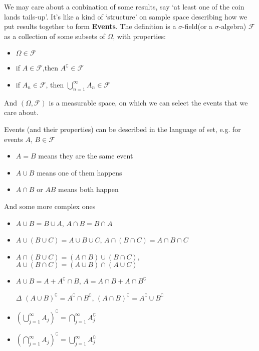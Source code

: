     We may care about a conbination of some results, say `at least one of the coin lands tails-up'. It's like a kind of `structure' on sample space describing how we put results together to form \textbf{Events}. The definition is  a $\sigma$-field(or a $\sigma$-algebra) $\mathscr{F}$ as a collection of some subsets of $\Omega$, with properties:
    \begin{itemize}[topsep=2pt,itemsep=0pt]
        \item $\Omega\in\mathscr{F}$
        \item if $A\in\mathscr{F}$,then $A^\complement \in\mathscr{F}$
        \item if $A_n\in\mathscr{F}$, then ${\displaystyle\bigcup_{n=1}^\infty} A_n\in\mathscr{F}$
    \end{itemize}

    And $(\Omega,\mathscr{F})$ is a measurable space, on which we can select the events that we care about.

    Events (and their properties) can be described in the language of set, e.g. for events $ A $, $ B\in\mathscr{F} $
\begin{itemize}[topsep=2pt,itemsep=0pt]
    \item $ A=B $ means they are the same event
    \item $ A\cup B $ means one of them happens
    \item $ A\cap B $ or $ AB $ means both happen 
\end{itemize}

And some more complex ones
\begin{itemize}[topsep=2pt,itemsep=0pt]
    \item $ A\cup B=B\cup A $, $ A\cap B=B\cap A $
    \item $ A\cup (B\cup C)=A\cup B\cup C $, $ A\cap (B\cap C)=A\cap B\cap C $
    \item $ A\cap (B\cup C)=(A\cap B)\cup (B\cap C) $, $ A\cup (B \cap C)=(A\cup B)\cap (A\cup C) $
    \item $ A\cup B=A+ A^\complement\cap B $, $ A=A\cap B+A\cap B^\complement $
    \item[$ \Delta  $] $ (A\cup B)^\complement =A^\complement\cap B^\complement $, $ (A\cap B)^\complement = A^\complement \cup B^\complement  $
    \item $ (\bigcup_{j=1}^\infty A_j)^\complement =\bigcap_{j=1}^\infty A_j^\complement $
    \item $ (\bigcap_{j=1}^\infty A_j)^\complement =\bigcup_{j=1}^\infty A_j^\complement $
\end{itemize}
    
